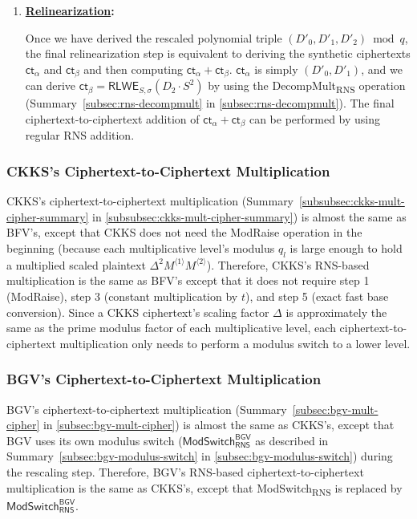 \begin{enumerate}
\item \textbf{\underline{Relinearization}:} 

Once we have derived the rescaled polynomial triple $(D'_0, D'_1, D'_2) \bmod q$, the final relinearization step is equivalent to deriving the synthetic ciphertexts $\textsf{ct}_\alpha$ and $\textsf{ct}_\beta$ and then computing $\textsf{ct}_\alpha + \textsf{ct}_\beta$. $\textsf{ct}_\alpha$ is simply $(D'_0, D'_1)$, and we can derive $\textsf{ct}_\beta = \textsf{RLWE}_{S, \sigma}(D_2 \cdot S^2)$ by using the \textsf{DecompMult\textsubscript{RNS}} operation (Summary~\ref*{subsec:rns-decompmult} in \autoref{subsec:rns-decompmult}). The final ciphertext-to-ciphertext addition of $\textsf{ct}_\alpha + \textsf{ct}_\beta$ can be performed by using regular RNS addition.

\end{enumerate}


\subsubsection{CKKS's Ciphertext-to-Ciphertext Multiplication}
\label{subsubsec:rns-cipher-mult-ckks}

CKKS's ciphertext-to-ciphertext multiplication (Summary~\ref*{subsubsec:ckks-mult-cipher-summary} in \autoref{subsubsec:ckks-mult-cipher-summary}) is almost the same as BFV's, except that CKKS does not need the \textsf{ModRaise} operation in the beginning (because each multiplicative level's modulus $q_l$ is large enough to hold a multiplied scaled plaintext $\Delta^2M^{\langle 1 \rangle}M^{\langle 2 \rangle}$). Therefore, CKKS's RNS-based multiplication is the same as BFV's except that it does not require step 1 (\textsf{ModRaise}), step 3 (constant multiplication by $t$), and step 5 (exact fast base conversion). Since a CKKS ciphertext's scaling factor $\Delta$ is approximately the same as the prime modulus factor of each multiplicative level, each ciphertext-to-ciphertext multiplication only needs to perform a 
modulus switch to a lower level.


\subsubsection{BGV's Ciphertext-to-Ciphertext Multiplication}
\label{subsubsec:rns-cipher-mult-bgv}

BGV's ciphertext-to-ciphertext multiplication (Summary~\ref*{subsec:bgv-mult-cipher} in \autoref{subsec:bgv-mult-cipher}) is almost the same as CKKS's, except that BGV uses its own modulus switch ($\textsf{ModSwitch}_{\textsf{RNS}}^{\textsf{BGV}}$ as described in Summary~\ref*{subsec:bgv-modulus-switch} in \autoref{subsec:bgv-modulus-switch}) during the rescaling step. Therefore, BGV's RNS-based ciphertext-to-ciphertext multiplication is the same as CKKS's, except that \textsf{ModSwitch\textsubscript{RNS}} is replaced by $\textsf{ModSwitch}_{\textsf{RNS}}^{\textsf{BGV}}$.


